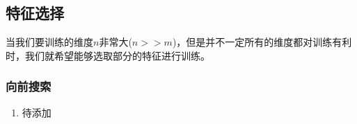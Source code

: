 \subsection{特征选择}
当我们要训练的维度$n$非常大($n >> m$)，但是并不一定所有的维度都对训练有利时，我们就希望能够选取部分的特征进行训练。

\subsubsection{向前搜索}
\begin{enumerate}
	\item 待添加
\end{enumerate}










